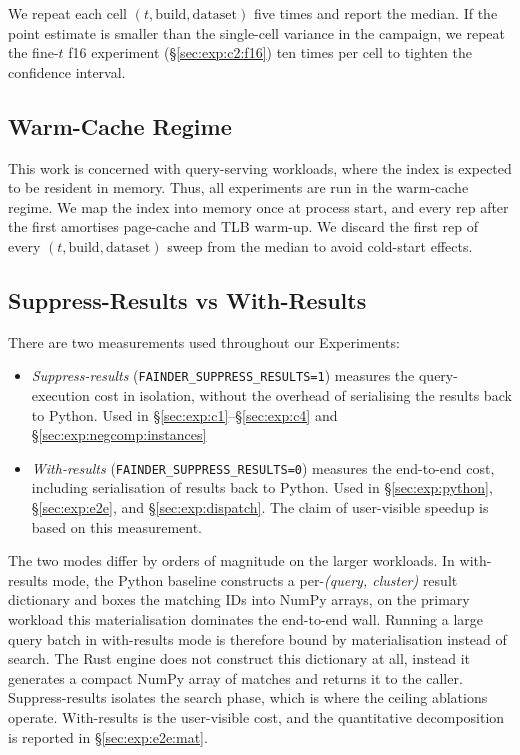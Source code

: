 We repeat each cell $(t, \text{build}, \text{dataset})$ five times and report the median. If the point estimate is smaller than the single-cell variance in the campaign, we repeat the fine-$t$ f16 experiment (§\ref{sec:exp:c2:f16}) ten times per cell to tighten the confidence interval.

\subsection{Warm-Cache Regime}

This work is concerned with query-serving workloads, where the index is expected to be resident in memory. Thus, all experiments are run in the warm-cache regime. We map the index into memory once at process start, and every rep after the first amortises page-cache and TLB warm-up. We discard the first rep of every $(t, \text{build}, \text{dataset})$ sweep from the median to avoid cold-start effects.


\subsection{Suppress-Results vs With-Results\label{sec:method:suppress}}

There are two measurements used throughout our Experiments:

\begin{itemize}
    \item \emph{Suppress-results} (\texttt{FAINDER\_SUPPRESS\_RESULTS=1}) measures the query-execution cost in isolation, without the overhead of serialising the results back to Python. Used in §\ref{sec:exp:c1}--§\ref{sec:exp:c4} and §\ref{sec:exp:negcomp:instances}
    \item \emph{With-results} (\texttt{FAINDER\_SUPPRESS\_RESULTS=0}) measures the end-to-end cost, including serialisation of results back to Python. Used in §\ref{sec:exp:python}, §\ref{sec:exp:e2e}, and §\ref{sec:exp:dispatch}. The claim of user-visible speedup is based on this measurement.
\end{itemize}

The two modes differ by orders of magnitude on the larger workloads. In with-results mode, the Python baseline constructs a per-\emph{(query, cluster)} result dictionary and boxes the matching IDs into NumPy arrays, on the primary workload this materialisation dominates the end-to-end wall. Running a large query batch in with-results mode is therefore bound by materialisation instead of search. The Rust engine does not construct this dictionary at all, instead it generates a compact NumPy array of matches and returns it to the caller. Suppress-results isolates the search phase, which is where the ceiling ablations operate. With-results is the user-visible cost, and the quantitative decomposition is reported in §\ref{sec:exp:e2e:mat}.


